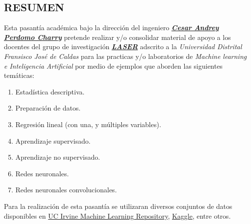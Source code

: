 
\begin{center}
\section*{RESUMEN}
\end{center}

\noindent Esta pasant\'ia acad\'emica bajo la direcci\'on del ingeniero
\textbf{\textit{\href{https://scienti.minciencias.gov.co/cvlac/visualizador/generarCurriculoCv.do?cod_rh=0000480762}{Cesar Andrey Perdomo Charry}}} pretende realizar y/o consolidar material de apoyo a los docentes del grupo de investigaci\'on \textbf{\textit{\href{https://comunidad.udistrital.edu.co/laser/}{LASER}}} adscrito a la \textit{Universidad Distrital Fransisco Jos\'e de Caldas} para las practicas y/o laboratorios de \textit{Machine learning e Inteligencia Artificial} por medio de ejemplos que aborden las siguientes tem\'aticas:
\\
\begin{enumerate}
	\item Estad\'istica descriptiva.
	\item Preparaci\'on de datos.
	\item Regresi\'on lineal (con una, y m\'ultiples variables).
	\item Aprendizaje supervisado.
	\item Aprendizaje no supervisado.
	\item Redes neuronales.
	\item Redes neuronales convolucionales.
\end{enumerate}
\noindent Para la realizaci\'on de esta pasant\'ia se utilizaran diversos conjuntos de datos disponibles en \href{https://archive.ics.uci.edu/ml/index.php}{UC Irvine Machine Learning Repository}, \href{https://www.kaggle.com}{Kaggle}, entre otros.